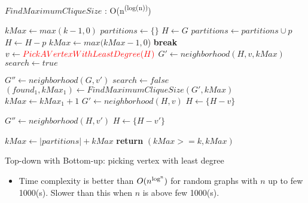 \documentclass[landscape]{slides}
\begin{document}
\begin{algorithm}
	\caption{$FindMaximumCliqueSize$ : O(n\textsuperscript{(log(n))})}
	\begin{algorithmic}[1]
		\State $kMax \gets max(k - 1, 0)$
		\State $partitions \gets \{\}$
		\State $H \gets G$
		\State $partitions \gets partitions \cup p$
		\State $H \gets H - p$
		\State $kMax \gets max(kMax - 1, 0$)
		\EndWhile
		\State \textbf{break}
		\EndIf
		\State $v \gets {\color{red} PickAVertexWithLeastDegree(H)}$
		\State $G' \gets neighborhood(H, v, kMax)$
		\State $search \gets true$
	\end{algorithmic}
\end{algorithm}


\begin{algorithm}
	\begin{algorithmic}[1]
		\State $G'' \gets neighborhood(G, v')$
		\State $search \gets false$
		\EndIf
		\EndFor
		\State $(found_1, kMax_1) \gets FindMaximumCliqueSize(G', kMax)$
		\State $kMax \gets kMax_1 + 1$
		\EndIf
		\EndIf
		\EndIf
		\State $G' \gets neighborhood(H, v)$
		\State $H \gets \{H - v\}$
		
		\State $G'' \gets neighborhood(H, v')$
			\State $H \gets \{H - v'\}$
		\EndIf
		\EndFor
	\end{algorithmic}
\end{algorithm}


\begin{algorithm}
	\begin{algorithmic}[1]
		\EndWhile
		\State $kMax \gets |partitions| + kMax$
		\State \textbf{return} $(kMax >= k, kMax)$
		\EndFunction
	\end{algorithmic}
\end{algorithm}

\clearpage

\begin{slide}
	\begin{center}{\large Top-down with Bottom-up: picking vertex with least degree}\end{center}
	\begin{itemize}
		\setlength{\itemsep}{0pt}
		\setlength{\parskip}{20pt}
		\setlength{\parsep}{0pt}
		\item Time complexity is better than $O(n\textsuperscript{log\textsuperscript{n}})$ for random graphs with $n$ up to few 1000(s). Slower than this when $n$ is above few 1000(s).
	\end{itemize}
\end{slide}
\end{document}
